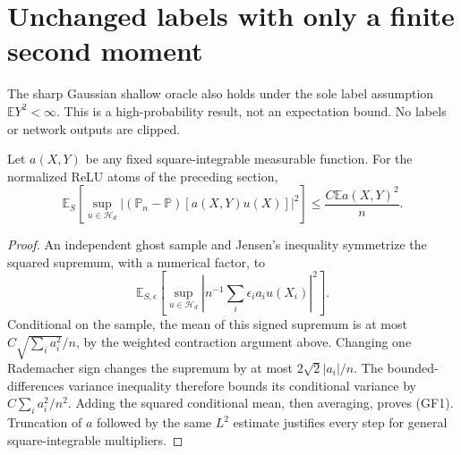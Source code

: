 \section{Unchanged labels with only a finite second moment}
\label{sec:general-shallow-finitevariance}
The sharp Gaussian shallow oracle also holds under the sole label
assumption $\mathbb E Y^2<\infty$. This is a high-probability result,
not an expectation bound. No labels or network outputs are clipped.

\begin{lemma}
Let $a(X,Y)$ be any fixed square-integrable measurable function.
For the normalized ReLU atoms of the preceding section,
\[
 \mathbb E_S\left[
 \sup_{u\in\mathcal H_d}
 |(\mathbb P_n-\mathbb P)[a(X,Y)u(X)]|^2\right]
 \le \frac{C\mathbb E a(X,Y)^2}{n}.                      \tag{GF1}
\]
\end{lemma}
\begin{proof}
An independent ghost sample and Jensen's inequality symmetrize
the squared supremum, with a numerical factor, to
\[
 \mathbb E_{S,\epsilon}
 \left[\sup_{u\in\mathcal H_d}
       \left|n^{-1}\sum_i\epsilon_i a_i u(X_i)\right|^2\right].
\]
Conditional on the sample, the mean of this signed supremum is at
most $C\sqrt{\sum_i a_i^2}/n$, by the weighted contraction argument
above. Changing one Rademacher sign changes the supremum by at most
$2\sqrt2|a_i|/n$. The bounded-differences variance inequality therefore
bounds its conditional variance by $C\sum_i a_i^2/n^2$.
Adding the squared conditional mean, then averaging, proves (GF1).
Truncation of $a$ followed by the same $L^2$ estimate justifies every
step for general square-integrable multipliers.
\end{proof}

